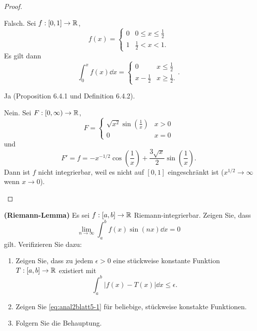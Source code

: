 \begin{proof}
	\begin{parts}
	\item Falsch. Sei $f:[0,1]\to \mathbb{R}$,
		\[
		f(x)=\begin{cases}
			0 & 0 \le x \le \frac{1}{2}\\
			1 & \frac{1}{2}< x < 1.
		\end{cases}
	\]
	Es gilt dann
	\[
		\int_0^x f(x)\dd{x}=\begin{cases}
			0 & x\le \frac{1}{2}\\
			x-\frac{1}{2} & x\ge \frac{1}{2}.
		\end{cases}
	.\] 
\item Ja (Proposition 6.4.1 und Definition 6.4.2).
\item Nein. Sei $F:[0,\infty)\to \mathbb{R}$,
	\[
	F=\begin{cases}
		\sqrt{x^2} \sin\left( \frac{1}{x} \right) & x > 0 \\
		0 & x = 0
	\end{cases}
\]
und
\[
F'=	f=-x^{- 1 / 2}\cos\left( \frac{1}{x} \right) +\frac{3\sqrt{x} }{2}\sin\left( \frac{1}{x} \right) 
.\]
Dann ist $f$ nicht integrierbar, weil es nicht auf $[0,1]$ eingeschränkt ist ($x^{1 / 2}\to \infty$ wenn $x\to 0$).\qedhere
	\end{parts}
\end{proof}
\begin{Problem}
	\textbf{(Riemann-Lemma)} Es sei $f:[a,b]\to \mathbb{R}$ Riemann-integrierbar. Zeigen Sie, dass
	\begin{equation}\tag{5.1}\label{eq:anal2blatt5-1}
		\lim_{n \to \infty} \int_a^b f(x)\sin(nx)\dd{x}=0
	\end{equation}
		gilt. Verifizieren Sie dazu:
		\begin{enumerate}[label=(\roman*)]
			\item Zeigen Sie, dass zu jedem $\epsilon>0$ eine stückweise konstante Funktion $T : [a, b] \to \mathbb{R}$ existiert mit
				\[
					\int_a^b |f(x)-T(x)|\dd{x}\le\epsilon
				.\] 
			\item Zeigen Sie \eqref{eq:anal2blatt5-1} f\"{u}r beliebige, stückweise konstakte Funktionen.
			\item Folgern Sie die Behauptung.
		\end{enumerate}
\end{Problem}
